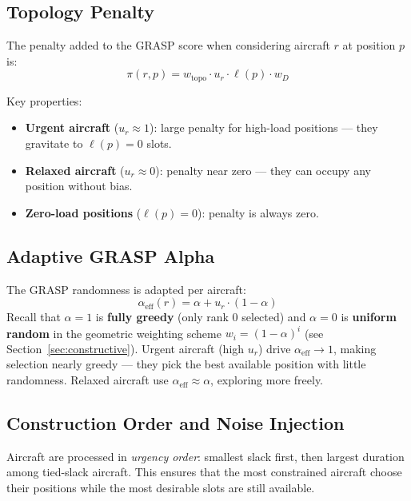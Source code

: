 \subsection{Topology Penalty}

The penalty added to the GRASP score when considering aircraft $r$ at position
$p$ is:
\begin{equation}
    \pi(r, p)
    = w_{\text{topo}} \cdot u_r \cdot \ell(p) \cdot w_D
    \label{eq:topo-penalty}
\end{equation}

\noindent Key properties:
\begin{itemize}[noitemsep]
    \item \textbf{Urgent aircraft} ($u_r \approx 1$): large penalty for high-load
          positions — they gravitate to $\ell(p) = 0$ slots.
    \item \textbf{Relaxed aircraft} ($u_r \approx 0$): penalty near zero — they
          can occupy any position without bias.
    \item \textbf{Zero-load positions} ($\ell(p) = 0$): penalty is always zero.
\end{itemize}

\subsection{Adaptive GRASP Alpha}

The GRASP randomness is adapted per aircraft:
\begin{equation}
    \alpha_{\text{eff}}(r) = \alpha + u_r \cdot (1 - \alpha)
    \label{eq:adaptive-alpha}
\end{equation}
Recall that $\alpha=1$ is \textbf{fully greedy} (only rank 0 selected) and
$\alpha=0$ is \textbf{uniform random} in the geometric weighting scheme
$w_i = (1-\alpha)^i$ (see Section~\ref{sec:constructive}).
Urgent aircraft (high $u_r$) drive $\alpha_{\text{eff}} \to 1$, making
selection nearly greedy — they pick the best available position with little
randomness.  Relaxed aircraft use $\alpha_{\text{eff}} \approx \alpha$,
exploring more freely.

\subsection{Construction Order and Noise Injection}

Aircraft are processed in \emph{urgency order}: smallest slack first, then
largest duration among tied-slack aircraft.  This ensures that the most
constrained aircraft choose their positions while the most desirable slots are
still available.

